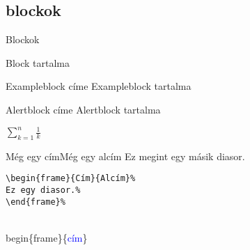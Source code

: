 \documentclass[aspectratio=169,12pt,xcolor={table}]{beamer}
\begin{document}
\subsection{blockok}
\begin{frame}{Blockok}
\begin{block}{}
Block tartalma
\end{block}
\begin{exampleblock}{Exampleblock címe}
Exampleblock tartalma
\end{exampleblock}
\begin{alertblock}{Alertblock címe} \pause
Alertblock tartalma
\end{alertblock}
\begin{theorem}
$\sum_{k=1}^n \frac{1}{k}$
\end{theorem}
\end{frame}
\begin{frame}{Még egy cím}{Még egy alcím}
Ez megint egy másik diasor.
\begin{verbatim}
\begin{frame}{Cím}{Alcím}%
Ez egy diasor.%
\end{frame}%
\end{verbatim}
\begin{semiverbatim}
\\begin\{\alert{frame}\}\{\textcolor{blue}{cím}\}
\end{semiverbatim}
\end{frame}
\end{document}
